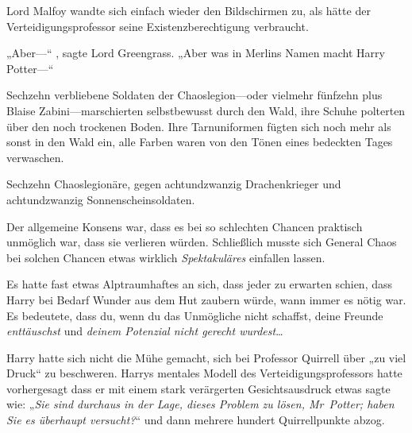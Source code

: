 Lord Malfoy wandte sich einfach wieder den Bildschirmen zu, als hätte der Verteidigungsprofessor seine Existenzberechtigung verbraucht.

„Aber—“ , sagte Lord Greengrass. „Aber was in Merlins Namen macht Harry Potter—“

\later

Sechzehn verbliebene Soldaten der Chaoslegion—oder vielmehr fünfzehn plus Blaise Zabini—marschierten selbstbewusst durch den Wald, ihre Schuhe polterten über den noch trockenen Boden. Ihre Tarnuniformen fügten sich noch mehr als sonst in den Wald ein, alle Farben waren von den Tönen eines bedeckten Tages verwaschen.

Sechzehn Chaoslegionäre, gegen achtundzwanzig Drachenkrieger und achtundzwanzig Sonnenscheinsoldaten.

Der allgemeine Konsens war, dass es bei so schlechten Chancen praktisch unmöglich war, dass sie verlieren würden. Schließlich musste sich General Chaos bei solchen Chancen etwas wirklich \emph{Spektakuläres} einfallen lassen.

Es hatte fast etwas Alptraumhaftes an sich, dass jeder zu erwarten schien, dass Harry bei Bedarf Wunder aus dem Hut zaubern würde, wann immer es nötig war. Es bedeutete, dass du, wenn du das Unmögliche nicht schaffst, deine Freunde \emph{enttäuschst} und \emph{deinem Potenzial nicht gerecht wurdest}…

Harry hatte sich nicht die Mühe gemacht, sich bei Professor Quirrell über „zu viel Druck“ zu beschweren. Harrys mentales Modell des Verteidigungsprofessors hatte vorhergesagt dass er mit einem stark verärgerten Gesichtsausdruck etwas sagte wie: „\emph{Sie sind durchaus in der Lage, dieses Problem zu lösen, Mr~Potter; haben Sie es überhaupt versucht?}“ und dann mehrere hundert Quirrellpunkte abzog.

